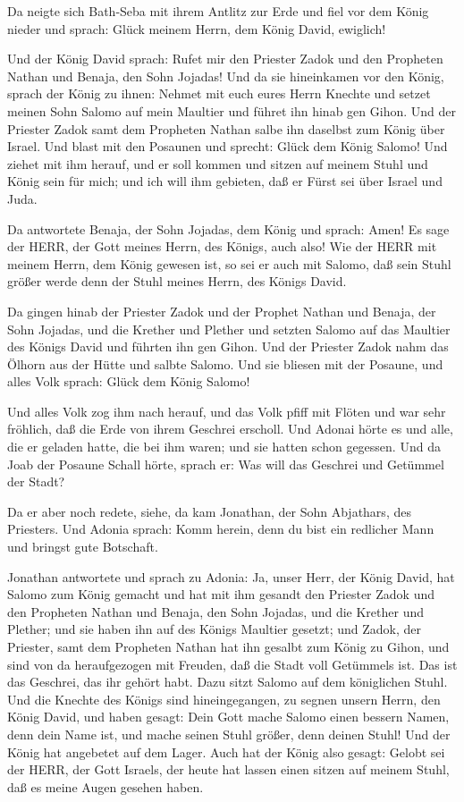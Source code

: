  Da neigte sich Bath-Seba mit ihrem Antlitz zur Erde und
fiel vor dem König nieder und sprach: Glück meinem Herrn, dem König
David, ewiglich!

 Und der König David sprach: Rufet mir den Priester Zadok
und den Propheten Nathan und Benaja, den Sohn Jojadas! Und da sie
hineinkamen vor den König,  sprach der König zu ihnen:
Nehmet mit euch eures Herrn Knechte und setzet meinen Sohn Salomo auf
mein Maultier und führet ihn hinab gen Gihon.  Und der
Priester Zadok samt dem Propheten Nathan salbe ihn daselbst zum König
über Israel. Und blast mit den Posaunen und sprecht: Glück dem König
Salomo!  Und ziehet mit ihm herauf, und er soll kommen und
sitzen auf meinem Stuhl und König sein für mich; und ich will ihm
gebieten, daß er Fürst sei über Israel und Juda.

 Da antwortete Benaja, der Sohn Jojadas, dem König und
sprach: Amen! Es sage der HERR, der Gott meines Herrn, des Königs, auch
also!  Wie der HERR mit meinem Herrn, dem König gewesen
ist, so sei er auch mit Salomo, daß sein Stuhl größer werde denn der
Stuhl meines Herrn, des Königs David.

 Da gingen hinab der Priester Zadok und der Prophet Nathan
und Benaja, der Sohn Jojadas, und die Krether und Plether und setzten
Salomo auf das Maultier des Königs David und führten ihn gen Gihon.
 Und der Priester Zadok nahm das Ölhorn aus der Hütte und
salbte Salomo. Und sie bliesen mit der Posaune, und alles Volk sprach:
Glück dem König Salomo!

 Und alles Volk zog ihm nach herauf, und das Volk pfiff mit
Flöten und war sehr fröhlich, daß die Erde von ihrem Geschrei erscholl.
 Und Adonai hörte es und alle, die er geladen hatte, die
bei ihm waren; und sie hatten schon gegessen. Und da Joab der Posaune
Schall hörte, sprach er: Was will das Geschrei und Getümmel der Stadt?

 Da er aber noch redete, siehe, da kam Jonathan, der Sohn
Abjathars, des Priesters. Und Adonia sprach: Komm herein, denn du bist
ein redlicher Mann und bringst gute Botschaft.

 Jonathan antwortete und sprach zu Adonia: Ja, unser Herr,
der König David, hat Salomo zum König gemacht  und hat mit
ihm gesandt den Priester Zadok und den Propheten Nathan und Benaja, den
Sohn Jojadas, und die Krether und Plether; und sie haben ihn auf des
Königs Maultier gesetzt;  und Zadok, der Priester, samt dem
Propheten Nathan hat ihn gesalbt zum König zu Gihon, und sind von da
heraufgezogen mit Freuden, daß die Stadt voll Getümmels ist. Das ist das
Geschrei, das ihr gehört habt.  Dazu sitzt Salomo auf dem
königlichen Stuhl.  Und die Knechte des Königs sind
hineingegangen, zu segnen unsern Herrn, den König David, und haben
gesagt: Dein Gott mache Salomo einen bessern Namen, denn dein Name ist,
und mache seinen Stuhl größer, denn deinen Stuhl! Und der König hat
angebetet auf dem Lager.  Auch hat der König also gesagt:
Gelobt sei der HERR, der Gott Israels, der heute hat lassen einen sitzen
auf meinem Stuhl, daß es meine Augen gesehen haben.

